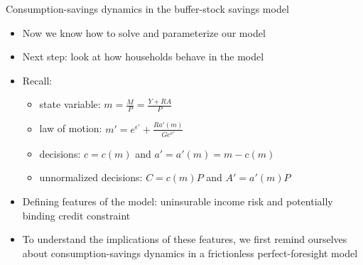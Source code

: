 \documentclass[9pt]{beamer}
\newcommand{\bit}{\begin{itemize}}
\newcommand{\eit}{\end{itemize}}
\begin{document}
\begin{frame}{Consumption-savings dynamics in the buffer-stock savings model}

\bit
\setlength\itemsep{1.5em}

\item Now we know how to solve and parameterize our model

\item Next step: look at how households behave in the model

\item Recall:
\bit
\setlength\itemsep{0.5em}
	\item state variable: $m=\frac{M}{P} = \frac{Y+RA}{P}$
	
	\item law of motion: $m'=e^{\epsilon'} + \frac{Ra'(m)}{G e^{\nu'}}$
	
	\item decisions: $c=c(m)$ and $a'=a'(m) =m-c(m)$
	
	\item unnormalized decisions: $C=c(m)P$ and $A' = a'(m) P$
\eit

\item Defining features of the model: uninsurable income risk and potentially binding credit constraint

\item To understand the implications of these features, we first remind ourselves about consumption-savings dynamics in a frictionless perfect-foresight model

\eit

\end{frame}
\end{document}
